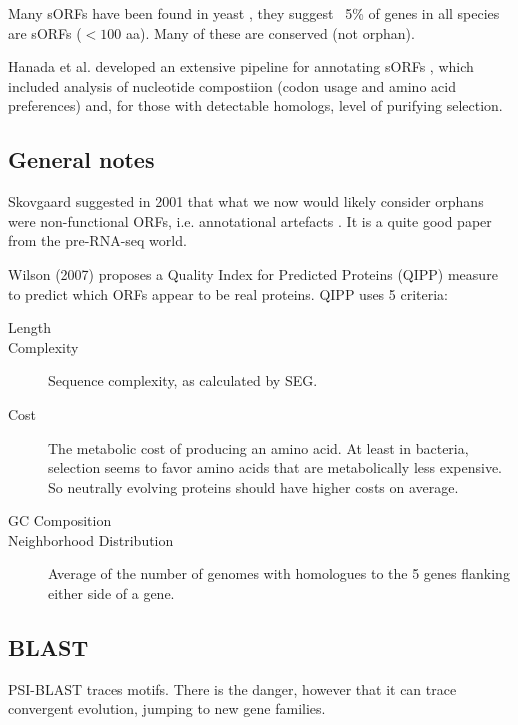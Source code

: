   Many sORFs have been found in yeast \cite{kastenmayer_functional_2006}, they
  suggest ~5\% of genes in all species are sORFs ($<100$ aa). Many of these are
  conserved (not orphan).

  Hanada et al. developed an extensive pipeline for annotating sORFs
  \cite{hanada_large_2007}, which included analysis of nucleotide compostiion
  (codon usage and amino acid preferences) and, for those with detectable
  homologs, level of purifying selection.


\subsection{General notes}
Skovgaard suggested in 2001 that what we now would likely consider orphans
were non-functional ORFs, i.e. annotational artefacts
\cite{skovgaard_total_2001}. It is a quite good paper from the pre-RNA-seq
world.

Wilson (2007) \cite{wilson_large-scale_2007} proposes a Quality Index for
Predicted Proteins (QIPP) measure to predict which ORFs appear to be real
proteins. QIPP uses 5 criteria:

\begin{description}
    \item[Length]

    \item[Complexity] Sequence complexity, as calculated by SEG.

    \item[Cost]The metabolic cost of producing an amino acid. At least in
        bacteria, selection seems to favor amino acids that are
        metabolically less expensive. So neutrally evolving proteins should
        have higher costs on average.

    \item[GC Composition]

    \item[Neighborhood Distribution]Average of the number of genomes with
        homologues to the 5 genes flanking either side of a gene.
\end{description}


\subsection{BLAST}

PSI-BLAST traces motifs. There is the danger, however that it can trace
convergent evolution, jumping to new gene families. 

